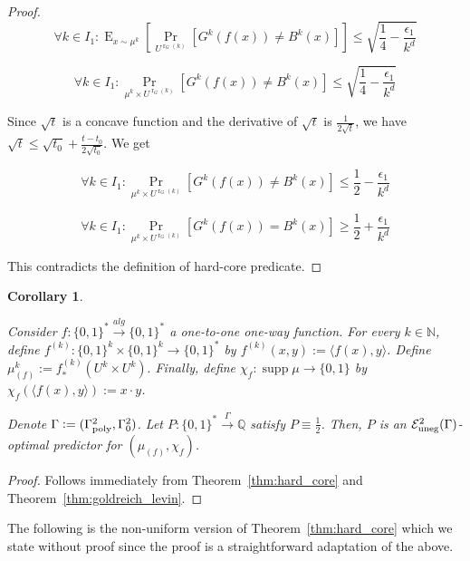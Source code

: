 \documentclass{article}
\theoremstyle{definition}
\theoremstyle{plain}
\newtheorem{corollary}{Corollary}[section]
\newcommand{\Words}{{\{ 0, 1 \}^*}}
\newcommand{\WordsLen}[1]{{\{ 0, 1 \}^{#1}}}
\newcommand{\Bool}{\{0,1\}}
\DeclareMathOperator{\Supp}{supp}
\DeclareMathOperator{\Prb}{Pr}
\DeclareMathOperator{\E}{E}
\DeclareMathOperator{\R}{r}
\newcommand{\Nats}{\mathbb{N}}
\newcommand{\Rats}{\mathbb{Q}}
\newcommand{\Chev}[1]{\langle #1 \rangle}
\begin{document}
\begin{proof}
$$ \forall k \in I_1: \E_{x \sim \mu^k}[\Prb_{U^{\R_G(k)}}[G^k(f(x)) \ne B^k(x)]] \leq \sqrt{\frac{1}{4} - \frac{\epsilon_1}{k^d}} $$

$$ \forall k \in I_1: \Prb_{\mu^k \times U^{\R_G(k)}}[G^k(f(x)) \ne B^k(x)] \leq \sqrt{\frac{1}{4} - \frac{\epsilon_1}{k^d}} $$

Since $\sqrt{t}$ is a concave function and the derivative of $\sqrt{t}$ is $\frac{1}{2\sqrt{t}}$, we have $\sqrt{t} \leq \sqrt{t_0} + \frac{t-t_0}{2\sqrt{t_0}}$. We get

$$ \forall k \in I_1: \Prb_{\mu^k \times U^{\R_G(k)}}[G^k(f(x)) \ne B^k(x)] \leq \frac{1}{2}-\frac{\epsilon_1}{k^d}$$

$$ \forall k \in I_1: \Prb_{\mu^k \times U^{\R_G(k)}}[G^k(f(x)) = B^k(x)] \geq \frac{1}{2}+\frac{\epsilon_1}{k^d}$$

This contradicts the definition of hard-core predicate.

\end{proof}

\begin{corollary}
\label{thm:one_way}

Consider $f: \Words \xrightarrow{alg} \Words$ a one-to-one one-way function. For every $k \in \Nats$, define $f^{(k)}: \WordsLen{k} \times \WordsLen{k} \rightarrow \Words$ by ${f^{(k)}(x,y):=\Chev{f(x),y}}$. Define $\mu_{(f)}^k:=f_*^{(k)}(U^k \times U^k).$ Finally, define $\chi_f: \Supp \mu \rightarrow \Bool$ by ${\chi_f(\Chev{f(x),y}):=x \cdot y}$.

Denote $\Gamma:=(\Gamma_{\textnormal{poly}}^2,\Gamma_0^2)$. Let $P: \Words \xrightarrow{\Gamma} \Rats$ satisfy $P \equiv \frac{1}{2}$. Then, $P$ is an $\mathcal{E}_{\textnormal{uneg}}^2(\Gamma)$-optimal predictor for $(\mu_{(f)}, \chi_f)$.

\end{corollary}

\begin{proof}

Follows immediately from Theorem~\ref{thm:hard_core} and Theorem~\ref{thm:goldreich_levin}.

\end{proof}

The following is the non-uniform version of Theorem~\ref{thm:hard_core} which we state without proof since the proof is a straightforward adaptation of the above.
\end{document}
